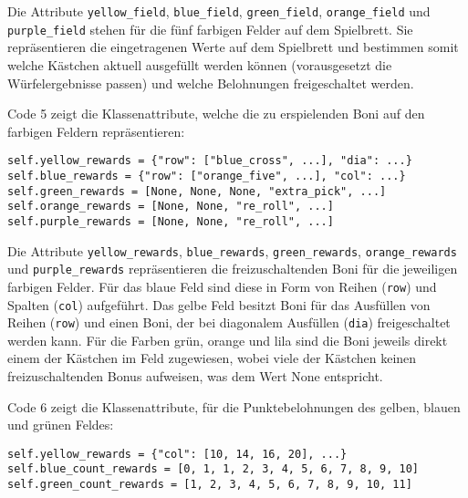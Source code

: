 Die Attribute \texttt{yellow\_field}, \texttt{blue\_field}, \texttt{green\_field}, \texttt{orange\_field} und \texttt{purple\_field} stehen für die fünf farbigen Felder auf dem Spielbrett. Sie repräsentieren die eingetragenen Werte auf dem Spielbrett und bestimmen somit welche Kästchen aktuell ausgefüllt werden können (vorausgesetzt die Würfelergebnisse passen) und welche Belohnungen freigeschaltet werden.\\

\begin{minipage}{\linewidth}
Code 5 zeigt die Klassenattribute, welche die zu erspielenden Boni auf den farbigen Feldern repräsentieren:
\vspace{0.5cm}
\begin{lstlisting}[caption={Klassenattribute für freizuschaltende Boni}, basicstyle=\ttfamily]
self.yellow_rewards = {"row": ["blue_cross", ...], "dia": ...}
self.blue_rewards = {"row": ["orange_five", ...], "col": ...}
self.green_rewards = [None, None, None, "extra_pick", ...]
self.orange_rewards = [None, None, "re_roll", ...]
self.purple_rewards = [None, None, "re_roll", ...]
\end{lstlisting}
\end{minipage}

Die Attribute \texttt{yellow\_rewards}, \texttt{blue\_rewards}, \texttt{green\_rewards}, \texttt{orange\_rewards} und \texttt{purple\_rewards} repräsentieren die freizuschaltenden Boni für die jeweiligen farbigen Felder. Für das blaue Feld sind diese in Form von Reihen (\texttt{row}) und Spalten (\texttt{col}) aufgeführt. Das gelbe Feld besitzt Boni für das Ausfüllen von Reihen (\texttt{row}) und einen Boni, der bei diagonalem Ausfüllen (\texttt{dia}) freigeschaltet werden kann. Für die Farben grün, orange und lila sind die Boni jeweils direkt einem der Kästchen im Feld zugewiesen, wobei viele der Kästchen keinen freizuschaltenden Bonus aufweisen, was dem Wert None entspricht.\\

\begin{minipage}{\linewidth}
Code 6 zeigt die Klassenattribute, für die Punktebelohnungen des gelben, blauen und grünen Feldes:
\vspace{0.5cm}
\begin{lstlisting}[caption={Klassenattribute für freizuschaltende Punktebelohnungen des gelben, blauen und grünen Feldes}, basicstyle=\ttfamily]
self.yellow_rewards = {"col": [10, 14, 16, 20], ...}
self.blue_count_rewards = [0, 1, 1, 2, 3, 4, 5, 6, 7, 8, 9, 10]
self.green_count_rewards = [1, 2, 3, 4, 5, 6, 7, 8, 9, 10, 11]
\end{lstlisting}
\end{minipage}

